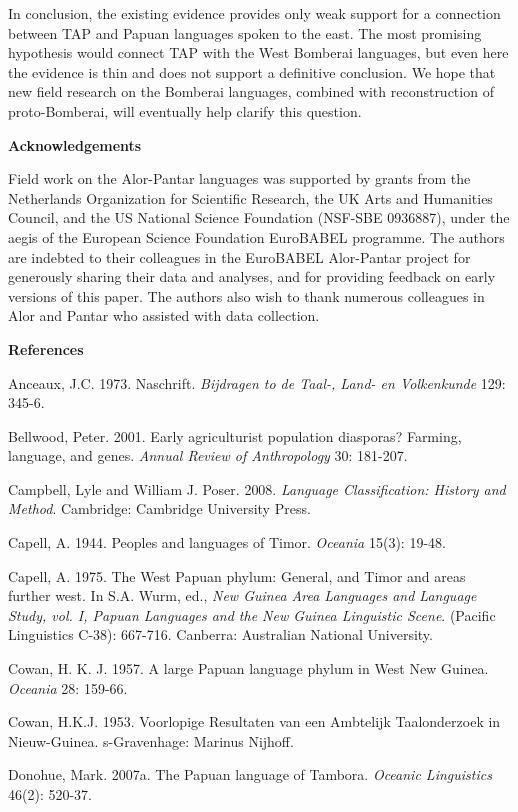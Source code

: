In conclusion, the existing evidence provides only weak support for a connection between TAP and Papuan languages spoken to the east. The most promising hypothesis would connect TAP with the West Bomberai languages, but even here the evidence is thin and does not support a definitive conclusion. We hope that new field research on the Bomberai languages, combined with reconstruction of proto-Bomberai, will eventually help clarify this question. 

{\bfseries
Acknowledgements}

Field work on the Alor-Pantar languages was supported by grants from the Netherlands Organization for Scientific Research, the UK Arts and Humanities Council, and the US National Science Foundation (NSF-SBE 0936887), under the aegis of the European Science Foundation EuroBABEL programme. The authors are indebted to their colleagues in the EuroBABEL Alor-Pantar project for generously sharing their data and analyses, and for providing feedback on early versions of this paper. The authors also wish to thank numerous colleagues in Alor and Pantar who assisted with data collection. 

{\bfseries
References}

Anceaux, J.C. 1973. Naschrift. \textit{Bijdragen to de Taal-, Land- en Volkenkunde} 129: 345-6.

Bellwood, Peter. 2001. Early agriculturist population diasporas? Farming, language, and genes. \textit{Annual Review of Anthropology} 30: 181-207.

Campbell, Lyle and William J. Poser. 2008. \textit{Language Classification: History and Method}. Cambridge: Cambridge University Press.

Capell, A. 1944. Peoples and languages of Timor. \textit{Oceania} 15(3): 19-48.

Capell, A. 1975. The West Papuan phylum: General, and Timor and areas further west. In S.A. Wurm, ed., \textit{New Guinea Area Languages and Language Study, vol. I, Papuan Languages and the New Guinea Linguistic Scene}. (Pacific Linguistics C-38): 667-716. Canberra: Australian National University.

Cowan, H. K. J. 1957. A large Papuan language phylum in West New Guinea. \textit{Oceania} 28: 159-66.

Cowan, H.K.J. 1953. Voorlopige Resultaten van een Ambtelijk Taalonderzoek in Nieuw-Guinea. {\textquotesingle}s-Gravenhage: Marinus Nijhoff.

Donohue, Mark. 2007a. The Papuan language of Tambora. \textit{Oceanic Linguistics} 46(2): 520-37.

